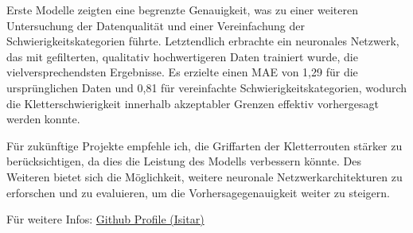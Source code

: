 \documentclass{article}
\begin{document}
Erste Modelle zeigten eine begrenzte Genauigkeit, was zu einer weiteren Untersuchung der Datenqualität und einer Vereinfachung der Schwierigkeitskategorien führte.
Letztendlich erbrachte ein neuronales Netzwerk, das mit gefilterten, qualitativ hochwertigeren Daten trainiert wurde,
die vielversprechendsten Ergebnisse. 
Es erzielte einen MAE von 1,29 für die ursprünglichen Daten und 0,81 für vereinfachte Schwierigkeitskategorien,
wodurch die Kletterschwierigkeit innerhalb akzeptabler Grenzen effektiv vorhergesagt werden konnte.

Für zukünftige Projekte empfehle ich, die Griffarten der Kletterrouten stärker zu berücksichtigen,
da dies die Leistung des Modells verbessern könnte. 
Des Weiteren bietet sich die Möglichkeit, weitere neuronale Netzwerkarchitekturen zu erforschen und zu evaluieren,
 um die Vorhersagegenauigkeit weiter zu steigern.

Für weitere Infos: \href{https://github.com/Isitar}{Github Profile (Isitar)}
\end{document}
